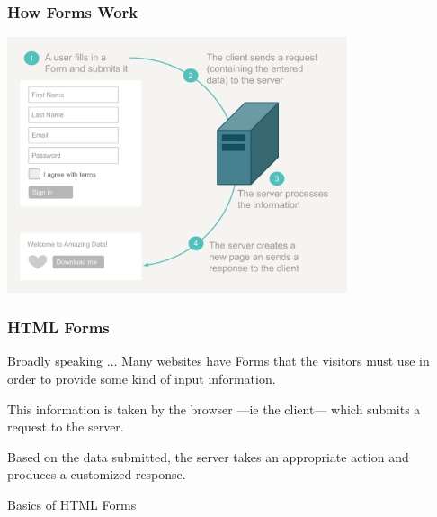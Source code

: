 \documentclass{beamer}\usepackage[]{graphicx}\usepackage[]{color}
\begin{document}
\begin{frame}[fragile]
\frametitle{How Forms Work}

\begin{center}
\includegraphics[width=10cm]{images/html_form_works.pdf}
\end{center}

\end{frame}


\begin{frame}[fragile]
\frametitle{HTML Forms}

\begin{block}{Broadly speaking ...}
Many websites have Forms that the visitors must use in order to provide some kind of input information.

\bigskip
This information is taken by the browser ---ie the client--- which submits a request to the server.

\bigskip
Based on the data submitted, the server takes an appropriate action and produces a customized response.
\end{block}

\end{frame}


\begin{frame}
 \begin{center}
  \Huge{\textcolor{mandarina}{Basics of HTML Forms}}
 \end{center}
\end{frame}

\end{document}

